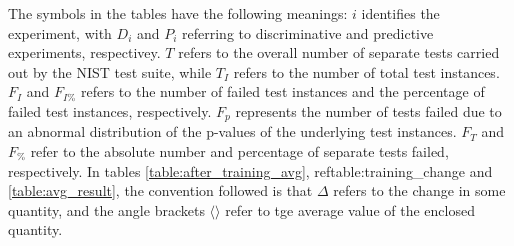 \documentclass[12pt, titlepage]{report}
\theoremstyle{definition}
\begin{document}
The symbols in the tables have the following meanings: $i$ identifies the experiment, with $D_i$ and $P_i$ referring to discriminative and predictive experiments, respectivey. $T$ refers to the overall number of separate tests carried out by the NIST test suite, while $T_I$ refers to the number of total test instances. $F_I$ and $F_{I\%}$ refers to the number of failed test instances and the percentage of failed test instances, respectively. $F_p$ represents the number of tests failed due to an abnormal distribution of the p-values of the underlying test instances. $F_T$ and $F_{\%}$ refer to the absolute number and percentage of separate tests failed, respectively. In tables \ref{table:after_training_avg}, ref{table:training_change} and \ref{table:avg_result}, the convention followed is that $\Delta$ refers to the change in some quantity, and the angle brackets $\langle \rangle$ refer to tge average value of the enclosed quantity.  
\end{document}

